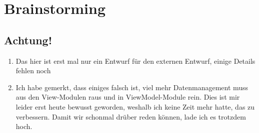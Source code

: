 \chapter{Brainstorming}
\section{Achtung!}
\begin{enumerate}
    \item Das hier ist erst mal nur ein Entwurf für den externen Entwurf, einige Details fehlen noch
    \item Ich habe gemerkt, dass einiges falsch ist, viel mehr Datenmanagement muss aus den View-Modulen raus und in ViewModel-Module rein.
            Dies ist mir leider erst heute bewusst geworden, weshalb ich keine Zeit mehr hatte, das zu verbessern.
            Damit wir schonmal drüber reden können, lade ich es trotzdem hoch.
\end{enumerate}

